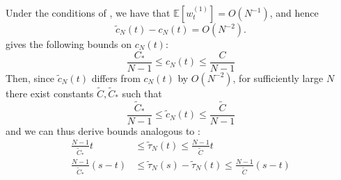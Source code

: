\documentclass{article}
\newcommand{\E}{\mathbb{E}}
\newcommand{\wt}[2][t]{w_{#1}^{(#2)}}
\begin{document}
Under the conditions of \citet[Corollary 2]{koskela2018}, we have that $\E[\wt{1}] = O(N^{-1})$, and hence
\begin{equation*}
\tilde{c}_N(t) - c_N(t) = O(N^{-2}).
\end{equation*}
\citet{koskela2018} gives the following bounds on $c_N(t)$:
\begin{equation*}
\frac{C_*}{N-1} \leq c_N(t) \leq \frac{C}{N-1}
\end{equation*}
Then, since $\tilde{c}_N(t)$ differs from $c_N(t)$ by $O(N^{-2})$, for sufficiently large $N$ there exist constants $\tilde{C}, \tilde{C}_*$ such that
\begin{equation*}
\frac{\tilde{C}_*}{N-1} \leq \tilde{c}_N(t) \leq \frac{\tilde{C}}{N-1}
\end{equation*}
and we can thus derive bounds analogous to \citet[(5)-(6)]{koskela2018}:
\begin{align}
\frac{N-1}{\tilde{C}_*}t &\leq \tilde{\tau}_N(t) \leq \frac{N-1}{\tilde{C}}t \\
\frac{N-1}{\tilde{C}_*}(s-t) &\leq \tilde{\tau}_N(s) - \tilde{\tau}_N(t) \leq \frac{N-1}{\tilde{C}}(s-t)
\end{align}


\end{document}
